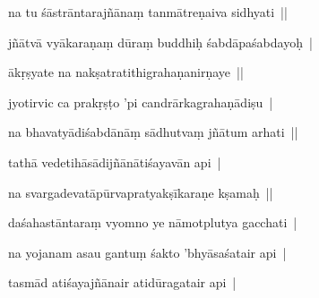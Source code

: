 \documentclass[article,12pt,a4paper]{memoir}%
\newcounter{parCount}
\begin{document}
	  
	  \pstart \leavevmode%
	na tu śāstrāntarajñānaṃ tanmātreṇaiva sidhyati || 
	{}
	\pend%
      

	  
	  \pstart \leavevmode%
	jñātvā vyākaraṇaṃ dūraṃ buddhiḥ śabdāpaśabdayoḥ | 
	{}
	\pend%
      

	  
	  \pstart \leavevmode%
	ākṛṣyate na nakṣatratithigrahaṇanirṇaye || 
	{}
	\pend%
      

	  
	  \pstart \leavevmode%
	jyotirvic ca prakṛṣṭo 'pi candrārkagrahaṇādiṣu | 
	{}
	\pend%
      

	  
	  \pstart \leavevmode%
	na bhavatyādiśabdānāṃ sādhutvaṃ jñātum arhati || 
	{}
	\pend%
      

	  
	  \pstart \leavevmode%
	tathā vedetihāsādijñānātiśayavān api | 
	{}
	\pend%
      

	  
	  \pstart \leavevmode%
	na svargadevatāpūrvapratyakṣīkaraṇe kṣamaḥ || 
	{}
	\pend%
      

	  
	  \pstart \leavevmode%
	daśahastāntaraṃ vyomno ye nāmotplutya gacchati | 
	{}
	\pend%
      

	  
	  \pstart \leavevmode%
	na yojanam asau gantuṃ śakto 'bhyāsaśatair api | 
	{}
	\pend%
      

	  
	  \pstart \leavevmode%
	tasmād atiśayajñānair atidūragatair api | 
	{}
	\pend%
      
\end{document}

